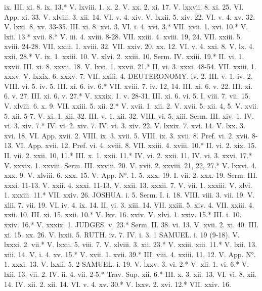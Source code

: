 ix.	III. xi. 8.
ix. 13.*	V. lxviii. 1.
x. 2.	V. xx. 2.
xi. 17.	V. lxxvii. 8.
xi. 25.	VI. App.
xi. 33.	V. xlviii. 3.
xii. 14.	VI. v. 4.
xiv.	V. lxxii. 5.
xiv. 22.	VI. v. 4.
xv. 32.	V. lxxi. 8.
xv. 33-35.	III. xi. 8.
xvi. 3.	VI. i. 4.
xvi. 3.*	VII. xvii. 1.
xvi. 10.*	V. lxii. 13.*
xvii. 8.*	V. iii. 4.
xviii. 8-28.	VII. xxiii. 4.
xviii. 19, 24.	VII. xxiii. 5.
xviii. 24-28.	VII. xxiii. 1.
xviii. 32.	VII. xxiv. 20.
xx. 12.	VI. v. 4.
xxi. 8.	V. lx. 4.
xxii. 28.*	V. ix. 1.
xxiii. 10.	V. xlvi. 2.
xxiii. 10.	Serm. IV.
xxiii. 19.*	II. vi. 1.
xxvii.	III. xi. 8.
xxvii. 18.	V. lxvi. 1.
xxvii. 21.*	II. vi. 3.
xxxi. 48-54.	VII. xxiii. 1.
xxxv.	V. lxxix. 6.
xxxv. 7.	VII. xxiii. 4.
DEUTERONOMY.
iv. 2.	III. v. 1.
iv. 2.	VIII. vi. 5.
iv. 5.	III. xi. 6.
iv. 6.*	VII. xviii. 7.
iv. 12, 14.	III. xi. 6.
v. 22.	III. xi. 6.
v. 27.	III. xi. 6.
v. 27.*	V. xxxix. 1.
v. 28-31.	III. xi. 6.
vi. 5.	I. viii. 7.
vii. 15.	V. xlviii. 6.
x. 9.	VII. xxiii. 5.
xii. 2.*	V. xvii. 1.
xii. 2.	V. xvii. 5.
xii. 4, 5.	V. xvii. 5.
xii. 5-7.	V. xi. 1.
xii. 32.	III. v. 1.
xii. 32.	VIII. vi. 5.
xiii.	Serm. III.
xiv. 1.	IV. vi. 3.
xiv. 7.*	IV. vi. 2.
xiv. 7.	IV. vi. 3.
xiv. 22.	V. lxxix. 7.
xvi. 14.	V. lxx. 3.
xvi. 18.	VI. App.
xvii. 2.	VIII. ix. 3.
xvii. 5.	VIII. ix. 3.
xvii. 8.	Pref. vi. 2.
xvii. 8-13.	VI. App.
xvii. 12.	Pref. vi. 4.
xviii. 8.	VII. xxiii. 4.
xviii. 10.*	II. vi. 2.
xix. 15.	II. vii. 2.
xxii. 10, 11.*	III. x. 1.
xxii. 11.*	IV. vi. 2.
xxii. 11.	IV. vi. 3.
xxvi. 17.*	V. xxxix. 1.
xxviii.	Serm. III.
xxviii. 20.	V. xvii. 2.
xxviii. 21, 22, 27.*	V. lxxvi. 4.
xxx. 9.	V. xlviii. 6.
xxx. 15.	V. App. N°. 1. 5.
xxx. 19.	I. vii. 2.
xxx. 19.	Serm. III.
xxxi. 11-13.	V. xxii. 4.
xxxi. 11-13.	V. xxii. 13.
xxxii. 7.	V. vii. 1.
xxxiii.	V. xlvi. 1.
xxxiii. 11.*	VII. xxiv. 26.
JOSHUA.
i. 5.	Serm. I.
i. 18.	VIII. viii. 3.
vii. 19.	V. xlii. 7.
vii. 19.	VI. iv. 4.
ix. 14.	II. vi. 3.
xiii. 14.	VII. xxiii. 5.
xiv. 4.	VII. xxiii. 4.
xxii. 10.	III. xi. 15.
xxii. 10.*	V. lxv. 16.
xxiv.	V. xlvi. 1.
xxiv. 15.*	III. i. 10.
xxiv. 16.*	V. xxxix. 1.
JUDGES.
v. 23.*	Serm. II. 38.
vi. 13.	V. xvii. 2.
xi. 40.	III. xi. 15.
xx. 26.	V. lxxii. 5.
RUTH.
iv. 7.	IV. i. 3.
1 SAMUEL.
i. 19 (9-18).	V. lxxxi. 2.
vii.*	V. lxxii. 5.
viii. 7.	V. xlviii. 3.
xii. 23.*	V. xxiii.
xiii. 11.*	V. lxii. 13.
xiii. 14.	V. i. 4.
xv. 15.*	V. xvii. 1.
xvii. 39.*	III. viii. 4.
xxiii. 11, 12.	V. App. N°. 1.
xxxi. 13.	V. lxxii. 5.
2 SAMUEL.
i. 19.	V. lxxv. 3.
vi. 2.*	V. xli. 1.
vi. 6.*	V. lxii. 13.
vii. 2.	IV. ii. 4.
vii. 2-5.*	Trav. Sup.
xii. 6.*	III. x. 3.
xii. 13.	VI. vi. 8.
xii. 14.	IV. xii. 2.
xii. 14.	VI. v. 4.
xv. 30.*	V. lxxv. 2.
xvi. 12.*	VII. xxiv. 16.
